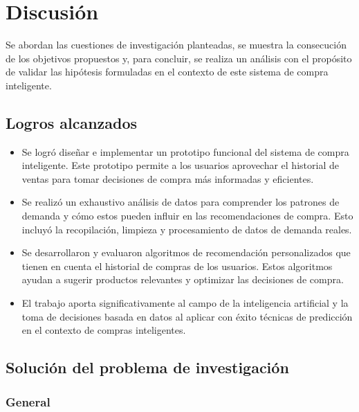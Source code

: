 \fancyhead{}
\fancyfoot{}
\cfoot{\thepage}


\chapter{Discusión}

 Se abordan las cuestiones de investigación planteadas, se muestra la consecución de los objetivos propuestos y, para concluir, se realiza un análisis con el propósito de validar las hipótesis formuladas en el contexto de este sistema de compra inteligente.

\section{Logros alcanzados}
  
\begin{itemize}
    \item  Se logró diseñar e implementar un prototipo funcional del sistema de compra inteligente. Este prototipo permite a los usuarios aprovechar el historial de ventas para tomar decisiones de compra más informadas y eficientes.
    
    \item  Se realizó un exhaustivo análisis de datos para comprender los patrones de demanda  y cómo estos pueden influir en las recomendaciones de compra. Esto incluyó la recopilación, limpieza y procesamiento de datos de demanda reales.
    
    \item Se desarrollaron y evaluaron algoritmos de recomendación personalizados que tienen en cuenta el historial de compras de los usuarios. Estos algoritmos ayudan a sugerir productos relevantes y optimizar las decisiones de compra.
    
    \item El trabajo aporta significativamente al campo de la inteligencia artificial y la toma de decisiones basada en datos al aplicar con éxito técnicas de predicción en el contexto de compras inteligentes.
\end{itemize}

\section{Solución del problema de investigación}

\subsection{General}

